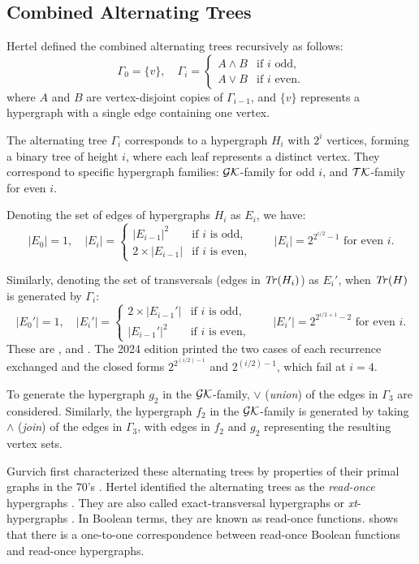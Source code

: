 \subsection{Combined Alternating Trees}

Hertel defined the combined alternating trees recursively as follows:
\[
\Gamma_0=\{v\},\quad\Gamma_i=\begin{cases}A\wedge B&\text{if }i\text{ odd},\\A\vee B&\text{if }i\text{ even.}\end{cases}
\]
where $A$ and $B$ are vertex-disjoint copies of $\Gamma_{i-1}$, and $\{v\}$ represents a hypergraph with a single edge containing one vertex. \cite{Her04}

The alternating tree $\Gamma_i$ corresponds to a hypergraph $H_i$ with $2^i$ vertices, forming a binary tree of height $i$, where each leaf represents a distinct vertex. They correspond to specific hypergraph families: $\mathcal{GK}$-family for odd $i$, and $\mathcal{TK}$-family for even $i$.

Denoting the set of edges of hypergraphs $H_i$ as $E_i$, we have:
\[
|E_0|=1,\quad|E_i|=\begin{cases}|E_{i-1}|^2&\text{if }i\text{ is odd,}\\2\times|E_{i-1}|&\text{if }i\text{ is even,}\end{cases}\qquad|E_i|=2^{2^{i/2}-1}\text{ for even }i.
\]

Similarly, denoting the set of transversals (edges in $\mathit{Tr}(H_i)$) as $E_i'$, when $\mathit{Tr}(H)$ is generated by $\Gamma_i$:
\[
|E_0'|=1,\quad|E_i'|=\begin{cases}2\times|E_{i-1}'|&\text{if }i\text{ is odd,}\\|E_{i-1}'|^2&\text{if }i\text{ is even,}\end{cases}\qquad|E_i'|=2^{2^{i/2+1}-2}\text{ for even }i.
\]
These are ,  and . The 2024 edition printed the two cases of each recurrence exchanged  and the closed forms $2^{2^{(i/2)-1}}$ and $2^{(i/2)-1}$, which fail at $i=4$.

To generate the hypergraph $g_2$ in the $\mathcal{GK}$-family, $\vee$ (\emph{union}) of the edges in $\Gamma_3$ are considered. Similarly, the hypergraph $f_2$ in the $\mathcal{GK}$-family is generated by taking $\wedge$ (\emph{join}) of the edges in $\Gamma_3$, with edges in $f_2$ and $g_2$ representing the resulting vertex sets.

Gurvich first characterized these alternating trees by properties of their primal graphs in the 70's \cite{Gc77}. Hertel identified the alternating trees as the \emph{read-once} hypergraphs \cite{Her04}. They are also called exact-transversal hypergraphs or \emph{xt}-hypergraphs \cite{Eit94}. In Boolean terms, they are known as read-once functions. \cite{GMR06} shows that there is a one-to-one correspondence between read-once Boolean functions and read-once hypergraphs.

